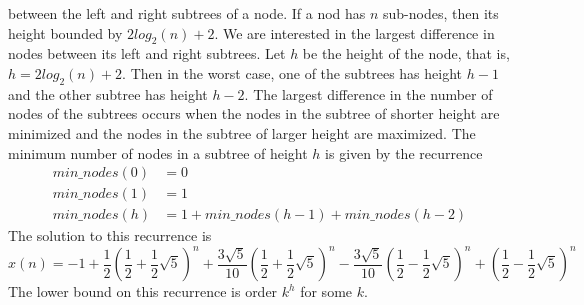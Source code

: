 between the left and right subtrees of a node.  If a nod has $n$ sub-nodes,
then its height bounded by $2log_2(n) + 2$. We are interested in the largest
difference in nodes between its left and right subtrees. Let $h$ be the height
of the node, that is, $h = 2log_2(n) + 2$. Then in the worst case, one of the
subtrees has height $h-1$ and the other subtree has height $h-2$. The largest
difference in the number of nodes of the subtrees occurs when the nodes in the
subtree of shorter height are minimized and the nodes in the subtree of larger
height are maximized. The minimum number of nodes in a subtree of height $h$ is
given by the recurrence
%
\begin{align*}
  min\_nodes(0) &= 0 \\
  min\_nodes(1) &= 1 \\
  min\_nodes(h) &= 1 + min\_nodes(h-1) + min\_nodes(h-2)
\end{align*}
%
The solution to this recurrence is
\[
  x(n) = -1+\frac{1}{2}\left(\frac{1}{2}+\frac{1}{2}\sqrt 5 \right)^n+\frac{3\sqrt 5}{10}\left(\frac{1}{2}+\frac{1}{2}\sqrt 5\right)^n -\frac{3\sqrt 5}{10}\left(\frac{1}{2}-\frac{1}{2}\sqrt 5\right)^n+\left(\frac{1}{2}-\frac{1}{2}\sqrt 5\right)^n
\]
The lower bound on this recurrence is order $k^h$ for some $k$.
